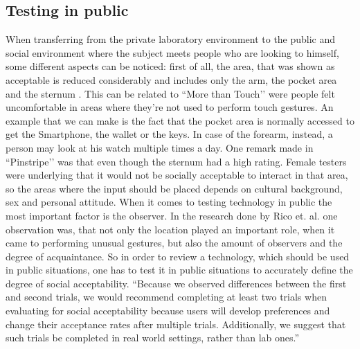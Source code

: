\documentclass{sigchi}
\begin{document}
\subsection{Testing in public}
%
When transferring from the private laboratory environment to the public and social environment where the subject meets people who are looking to himself, some different aspects can be noticed: first of all, the area, that was shown as acceptable is reduced considerably and includes only the arm, the pocket area and the sternum \cite{pinstripe}. This can be related to ``More than Touch’’  \cite{more-touch} were people felt uncomfortable in areas where they’re not used to perform touch gestures. An example that we can make is the fact that the pocket area is normally accessed to get the Smartphone, the wallet or the keys. In case of the forearm, instead, a person may look at his watch multiple times a day. One remark made in ``Pinstripe’’ \cite{pinstripe} was that even though the sternum had a high rating. Female testers were underlying that it would not be socially acceptable to interact in that area, so the areas where the input should be placed depends on cultural background, sex and personal attitude.
When it comes to testing technology in public the most important factor is the observer. In the research done by Rico et. al. \cite{usable-gesture} one observation was, that not only the location played an important role, when it came to performing unusual gestures, but also the amount of observers and the degree of acquaintance. So in order to review a technology, which should be used in public situations, one has to test it in public situations to accurately define the degree of social acceptability.
“Because we observed differences between the first and second trials, we would recommend completing at least two trials when evaluating for social acceptability because users will develop preferences and change their acceptance rates after multiple trials. Additionally, we suggest that such trials be completed in real world settings, rather than lab ones.” \cite[p. 9]{usable-gesture}%
\end{document}
